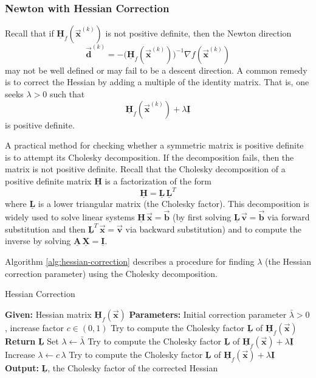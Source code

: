 \documentclass[9pt, headings=standardclasses, parskip=half]{scrartcl}
\renewcommand{\emph}[1]{\textcolor{mypurple}{#1}}
\newcommand{\matr}[1]{\underline{\boldsymbol{#1}}}
\newcommand{\vect}[1]{\vec{\boldsymbol{#1}}}
\begin{document}

\subsubsection{Newton with Hessian Correction}

Recall that if 
\(
\matr{H}_{f}(\vect{x}^{(k)}) 
\)
is not positive definite, then the Newton direction
\[
\vect{d}^{(k)} = -\big(\matr{H}_{f}(\vect{x}^{(k)})\big)^{-1}\nabla f(\vect{x}^{(k)}) %
\]
may not be well defined or may fail to be a descent direction. A common remedy is to \emph{correct} the Hessian by adding a multiple of the identity matrix. That is, one seeks \(\lambda > 0\) such that
\[
\matr{H}_{f}(\vect{x}^{(k)}) + \lambda \matr{I} %
\]
is positive definite.

A practical method for checking whether a symmetric matrix is positive definite is to attempt its Cholesky decomposition. %
If the decomposition fails, then the matrix is not positive definite. 
Recall that the Cholesky decomposition of a positive definite matrix \(\matr{H}\) is a factorization of the form
\[
\matr{H} = \matr{L}\,\matr{L}^T %
\]
where \(\matr{L}\) is a lower triangular matrix (the Cholesky factor). 
This decomposition is widely used to solve linear systems \(\matr{H}\,\vect{x} = \vect{b}\) (by first solving \(\matr{L}\,\vect{v}=\vect{b}\) via forward substitution and then \(\matr{L}^T\,\vect{x}=\vect{v}\) via backward substitution) and to compute the inverse by solving \(\matr{A}\,\matr{X} = \matr{I}\).

Algorithm \ref{alg:hessian-correction} describes a procedure for finding \(\lambda\) (the Hessian correction parameter) using the Cholesky decomposition.

\begin{algorithm}[h]
\caption{Hessian Correction}\label{alg:hessian-correction}
\begin{algorithmic}[1]
    \State \textbf{Given:} Hessian matrix \(\matr{H}_{f}(\vect{x})\)
    \State \textbf{Parameters:} Initial correction parameter \(\bar{\lambda}>0\), increase factor \(c \in (0,1)\)
    \State Try to compute the Cholesky factor \(\matr{L}\) of \(\matr{H}_{f}(\vect{x})\)
        \State \textbf{Return} \(\matr{L}\)
    \EndIf
    \State Set \(\lambda \leftarrow \bar{\lambda}\)
    \State Try to compute the Cholesky factor \(\matr{L}\) of \(\matr{H}_{f}(\vect{x}) + \lambda \matr{I}\)
        \State Increase \(\lambda \leftarrow c\,\lambda\)
        \State Try to compute the Cholesky factor \(\matr{L}\) of \(\matr{H}_{f}(\vect{x}) + \lambda \matr{I}\)
    \EndWhile
    \State \textbf{Output:} \(\matr{L}\), the Cholesky factor of the corrected Hessian %
\end{algorithmic}
\end{algorithm}
\end{document}
